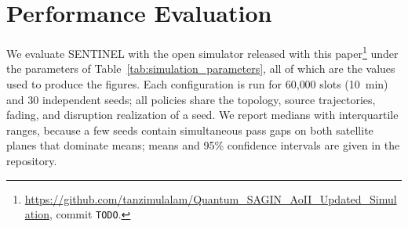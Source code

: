 
\section{Performance Evaluation}
\label{sec:performance}

We evaluate SENTINEL with the open simulator released with this paper\footnote{\url{https://github.com/tanzimulalam/Quantum_SAGIN_AoII_Updated_Simulation}, commit \texttt{TODO}.}
under the parameters of Table~\ref{tab:simulation_parameters}, all of which are the values used to produce the figures.
Each configuration is run for 60{,}000 slots (10~min) and 30 independent seeds; all policies share the topology,
source trajectories, fading, and disruption realization of a seed. We report medians with interquartile ranges, because
a few seeds contain simultaneous pass gaps on both satellite planes that dominate means; means and 95\% confidence
intervals are given in the repository.

